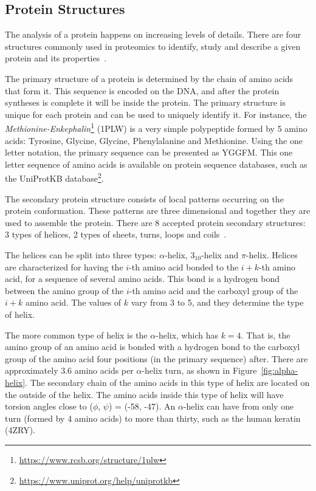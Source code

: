 \subsection{Protein Structures}
\label{sec:protein-structures}

The analysis of a protein happens on increasing levels of details. There are
four structures commonly used in proteomics to identify, study and describe a
given protein and its properties~\cite{tsai2003introduction}.

The primary structure of a protein is determined by the chain of amino acids
that form it. This sequence is encoded on the \ac{DNA}, and after the protein
syntheses is complete it will be inside the protein. The primary structure is
unique for each protein and can be used to uniquely identify it. For instance,
the
\textit{Methionine-Enkephalin}\footnote{\url{https://www.rcsb.org/structure/1plw}}
(1PLW) is a very simple polypeptide formed by 5 amino acids: Tyrosine, Glycine,
Glycine, Phenylalanine and Methionine. Using the one letter notation, the
primary sequence can be presented as YGGFM. This one letter sequence of amino
acids is available on protein sequence databases, such as the UniProtKB
database\footnote{\url{https://www.uniprot.org/help/uniprotkb}}.

The secondary protein structure consists of local patterns occurring on the
protein conformation. These patterns are three dimensional and together they
are used to assemble the protein. There are 8 accepted protein secondary
structures: 3 types of helices, 2 types of sheets, turns, loops and
coils~\cite{geourjon1995sopma}.

The helices can be split into three types: $\alpha$-helix, $3_{10}$-helix and
$\pi$-helix. Helices are characterized for having the $i$-th amino acid bonded
to the $i+k$-th amino acid, for a sequence of several amino acids. This bond is
a hydrogen bond between the amino group of the $i$-th amino acid and the
carboxyl group of the $i+k$ amino acid. The values of $k$ vary from 3 to 5, and
they determine the type of helix.

The more common type of helix is the $\alpha$-helix, which has $k=4$. That is,
the amino group of an amino acid is bonded with a hydrogen bond to the carboxyl
group of the amino acid four positions (in the primary sequence) after. There
are approximately $3.6$ amino acids per $\alpha$-helix turn, as shown in
Figure~\ref{fig:alpha-helix}. The secondary chain of the amino acids in this
type of helix are located on the outside of the  helix. The amino acids inside
this type of helix will have torsion angles close to ($\phi$, $\psi$) = (-58,
-47). An $\alpha$-helix can have from only one turn (formed by 4 amino acids)
to more than thirty, such as the human keratin (4ZRY).

